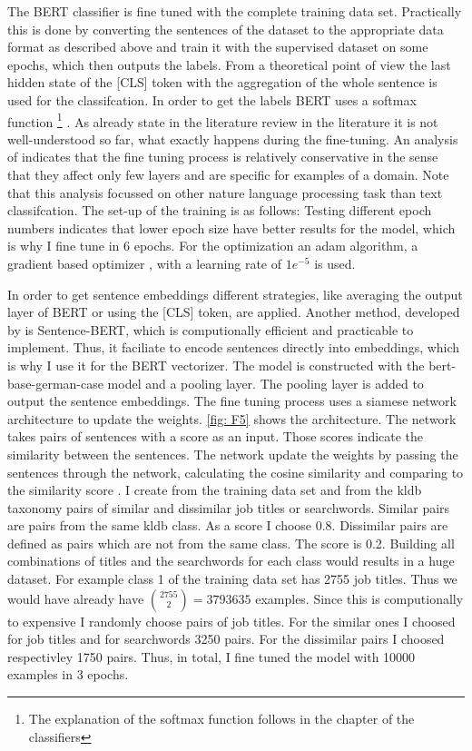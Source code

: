\documentclass[12pt, a4paper, titlepage]{article}
\begin{document}
The \ac{BERT} classifier is fine tuned with the complete training data set. Practically this is done by converting the sentences of the dataset to the appropriate data format as described above and train it with the supervised dataset on some epochs, which then outputs  the labels. From a theoretical point of view the last hidden state of the [CLS] token with the aggregation of the whole sentence is used for the classifcation. In order to get the labels \ac{BERT} uses a softmax function \footnote{The explanation of the softmax function follows in the chapter of the classifiers} \citep{sun2019}. As already state in the literature review in the literature it is not well-understood so far, what exactly happens during the fine-tuning. An analysis of \citet{merchant2020} indicates that the fine tuning process is relatively conservative in the sense that they affect only few layers and are specific for examples of a domain. Note that this analysis focussed on other nature language processing task than text classifcation. The set-up of the training is as follows: Testing different epoch numbers indicates that lower epoch size have better results for the model, which is why I fine tune in 6 epochs. For the optimization an adam algorithm, a gradient based optimizer \citep{kingma2014}, with a learning rate of $1e^{-5}$ is used. 

In order to get sentence embeddings different strategies, like averaging the output layer of \ac{BERT} or using the [CLS] token, are applied. Another method, developed by \citet{reimers2019} is Sentence-\ac{BERT}, which is computionally efficient and practicable to implement. Thus, it faciliate to encode sentences directly into embeddings, which is why I use it for the \ac{BERT} vectorizer. The model is constructed with the bert-base-german-case model and a pooling layer. The pooling layer is added to output the sentence embeddings. The fine tuning process uses a siamese network architecture to update the weights. \ref{fig: F5} shows the architecture. The network takes pairs of sentences with a score as an input. Those scores indicate the similarity between the sentences. The network update the weights by passing the sentences through the network, calculating the cosine similarity and comparing to the similarity score \citep{reimers2019}.
I create from the training data set and from the kldb taxonomy pairs of similar and dissimilar job titles or searchwords. Similar pairs are pairs from the same kldb class. As a score I choose 0.8. Dissimilar pairs are defined as pairs which are not from the same class. The score is 0.2. Building all combinations of titles and the searchwords for each class would results in a huge dataset. For example class 1 of the training data set has 2755 job titles. Thus we would have already have ${2755 \choose 2} = 3793635$ examples. Since this is computionally to expensive I randomly choose pairs of job titles. For the similar ones I choosed for job titles and for searchwords 3250 pairs. For the dissimilar pairs I choosed respectivley 1750 pairs. Thus, in total, I fine tuned the model with 10000 examples in 3 epochs.
\end{document}
